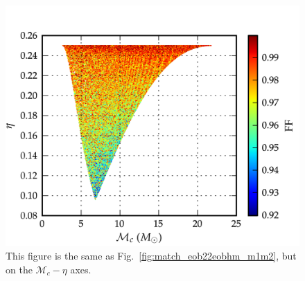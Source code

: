 \documentclass[aps,
prd,
amsmath,
amssymb,
twocolumn,
floatfix,
groupedaddress]{revtex4-1}
\begin{document}
\begin{figure}
\centering
\includegraphics[scale=0.04, clip=false, totalheight=0.3\textheight, width=\columnwidth]{EOBHMvsEOB22McEtaNolines.png} %
\caption{\label{fig:match_eob22eobhm_mceta}This figure is the same as
Fig.~\ref{fig:match_eob22eobhm_m1m2}, but on the $\mathcal{M}_c-\eta$ axes.}
\end{figure}
\end{document}
